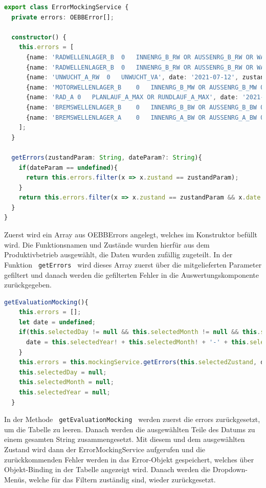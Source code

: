\begin{lstlisting}[language=Typescript, caption={Error-Mocking-Service}]
export class ErrorMockingService {
  private errors: OEBBError[];

  constructor() {
    this.errors = [
      {name: 'RADWELLENLAGER_B	0	INNENRG_B_RW OR AUSSENRG_B_RW OR WAELZK_B_RW', date: '2021-04-20', zustand: 'Lager'},
      {name: 'RADWELLENLAGER_B	0	INNENRG_B_RW OR AUSSENRG_B_RW OR WAELZK_B_RW', date: '2021-05-17', zustand: 'Lager'},
      {name: 'UNWUCHT_A_RW	0	UNWUCHT_VA', date: '2021-07-12', zustand: 'Auslauf'},
      {name: 'MOTORWELLENLAGER_B	0	INNENRG_B_MW OR AUSSENRG_B_MW OR WAELZK_B_MW', date: '2021-04-19', zustand: 'Auslauf 2'},
      {name: 'RAD_A	0	PLANLAUF_A_MAX OR RUNDLAUF_A_MAX', date: '2021-03-01', zustand: 'Schlag'},
      {name: 'BREMSWELLENLAGER_B	0	INNENRG_B_BW OR AUSSENRG_B_BW OR WAELZK_B_BW', date: '2021-06-09', zustand: 'Warmlauf'},
      {name: 'BREMSWELLENLAGER_A	0	INNENRG_A_BW OR AUSSENRG_A_BW OR WAELZK_A_BW', date: '2021-05-25', zustand: 'Wuchtlauf'},
    ];
  }

  getErrors(zustandParam: String, dateParam?: String){
    if(dateParam == undefined){
      return this.errors.filter(x => x.zustand == zustandParam);
    }
    return this.errors.filter(x => x.zustand == zustandParam && x.date == dateParam)
  }
}
\end{lstlisting}

Zuerst wird ein Array aus OEBBErrors angelegt, welches im Konstruktor befüllt wird. Die Funktionsnamen und Zustände wurden hierfür aus
dem Produktivbetrieb ausgewählt, die Daten wurden zufällig zugeteilt. In der Funktion \lstinline | getErrors | wird dieses Array zuerst
über die mitgelieferten Parameter gefiltert und danach werden die gefilterten Fehler in die Auswertungskomponente zurückgegeben.

\begin{lstlisting}[language=Typescript, caption={GetEvaluationMocking-Methode}]
  getEvaluationMocking(){
    this.errors = [];
    let date = undefined;
    if(this.selectedDay != null && this.selectedMonth != null && this.selectedYear != null){
      date = this.selectedYear! + this.selectedMonth! + '-' + this.selectedDay;
    }
    this.errors = this.mockingService.getErrors(this.selectedZustand, date);
    this.selectedDay = null;
    this.selectedMonth = null;
    this.selectedYear = null;
  }
\end{lstlisting}

In der Methode \lstinline | getEvaluationMocking | werden zuerst die errors zurückgesetzt, um die Tabelle zu leeren. Danach werden die ausgewählten
Teile des Datums zu einem gesamten String zusammengesetzt. Mit diesem und dem ausgewählten Zustand wird dann der ErrorMockingService
aufgerufen und die zurückkommenden Fehler werden in das Error-Objekt gespeichert, welches über Objekt-Binding in der Tabelle angezeigt 
wird. Danach werden die Dropdown-Menüs, welche für das Filtern zuständig sind, wieder zurückgesetzt.

